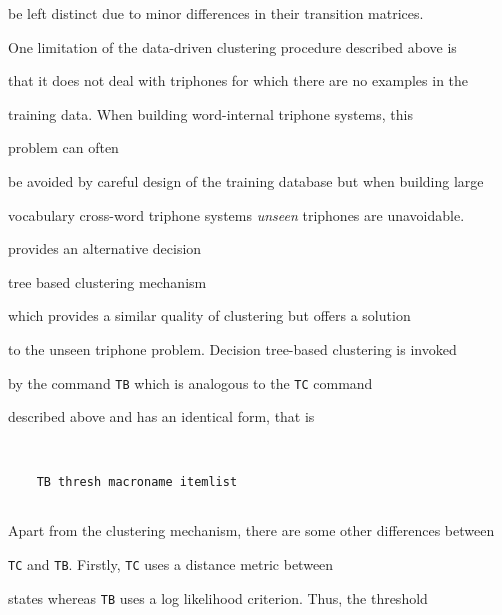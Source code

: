be left distinct due to minor differences in their transition matrices.












One limitation of the data-driven clustering procedure described above is


that it does not deal with triphones for which there are no examples in the


training data.  When building word-internal triphone systems,  this 


problem can often


be avoided by careful design of the training database but when building large


vocabulary cross-word triphone systems \textit{unseen} triphones are unavoidable.












 provides an alternative decision 


tree based clustering mechanism


which provides a similar quality of clustering but offers a solution 


to the unseen triphone problem.  Decision tree-based clustering is invoked


by the command \texttt{TB} which is analogous to the \texttt{TC} command


described above and has an identical form, that is


\begin{verbatim}


    TB thresh macroname itemlist


\end{verbatim}


Apart from the clustering mechanism, there are some other differences between


\texttt{TC} and \texttt{TB}.  Firstly, \texttt{TC} uses a distance metric between


states whereas \texttt{TB} uses a log likelihood criterion.  Thus, the threshold


